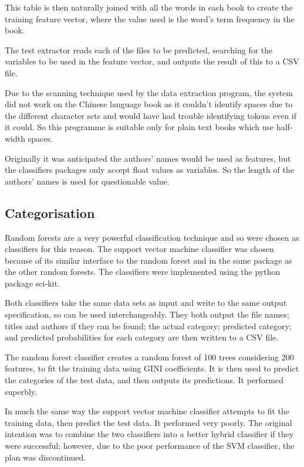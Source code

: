 \documentclass[11pt]{article}
\begin{document}
This table is then naturally joined with all the words in each book to create
the training feature vector, where the value used is the word's term frequency
in the book. 

The test extractor reads each of the files to be predicted, searching for the
variables to be used in the feature vector, and outputs the result of this to a
CSV file.

Due to the scanning technique used by the data extraction program, the system
did not work on the Chinese language book as it couldn't identify spaces due to
the different character sets and would have had trouble identifying tokens even
if it could. So this programme is suitable only for plain text books which use
half-width spaces.

Originally it was anticipated the authors' names would be used as features, but
the classifiers packages only accept float values as variables. So the length of
the authors' names is used for questionable value.

\subsection{Categorisation}

Random forests are a very powerful classification technique and so were chosen
as classifiers for this reason. The support vector machine classifier was chosen
because of its similar interface to the random forest and in the same package as
the other random forests. The classifiers were implemented using the python
package sci-kit.

Both classifiers take the same data sets as input and write to the same output
specification, so can be used interchangeably. They both output the file names;
titles and authors if they can be found; the actual category; predicted
category; and predicted probabilities for each category are then written to a
CSV file.

The random forest classifier creates a random forest of 100 trees considering
200 features, to fit the training data using GINI coefficients. It is then used
to predict the categories of the test data, and then outputs its predictions. It
performed superbly.

In much the same way the support vector machine classifier attempts to fit the
training data, then predict the test data. It performed very poorly. The
original intention was to combine the two classifiers into a better hybrid
classifier if they were successful; however, due to the poor performance of the
SVM classifier, the plan was discontinued.
\end{document}
